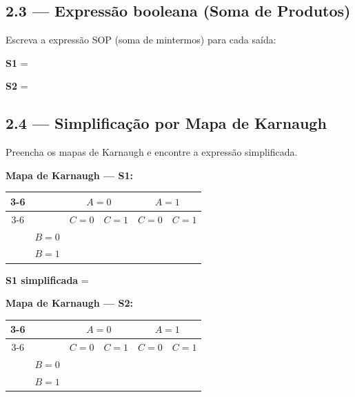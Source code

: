 \documentclass[12pt,a4paper]{article}
\newcommand{\resplinha}[1][4cm]{\underline{\hspace{#1}}}
\newcommand{\celula}{\rule{0pt}{14pt}\hspace{12pt}}
\begin{document}
\subsection{2.3 --- Expressão booleana (Soma de Produtos)}

Escreva a expressão SOP (soma de mintermos) para cada saída:

\noindent \textbf{S1} = \resplinha[10cm]

\vspace{6pt}
\noindent \textbf{S2} = \resplinha[10cm]

\subsection{2.4 --- Simplificação por Mapa de Karnaugh}

Preencha os mapas de Karnaugh e encontre a expressão simplificada.

\vspace{6pt}
\noindent\textbf{Mapa de Karnaugh --- S1:}
\begin{center}
\begin{tabular}{cc|c|c|c|c|}
\cline{3-6}
& & \multicolumn{2}{c|}{$A=0$} & \multicolumn{2}{c|}{$A=1$} \\
\cline{3-6}
& & $C=0$ & $C=1$ & $C=0$ & $C=1$ \\
\hline
\multicolumn{1}{|c}{\multirow{2}{*}{}} & $B=0$ & \celula & \celula & \celula & \celula \\
\cline{2-6}
\multicolumn{1}{|c}{} & $B=1$ & \celula & \celula & \celula & \celula \\
\hline
\end{tabular}
\end{center}

\noindent \textbf{S1 simplificada} = \resplinha[10cm]

\vspace{6pt}
\noindent\textbf{Mapa de Karnaugh --- S2:}
\begin{center}
\begin{tabular}{cc|c|c|c|c|}
\cline{3-6}
& & \multicolumn{2}{c|}{$A=0$} & \multicolumn{2}{c|}{$A=1$} \\
\cline{3-6}
& & $C=0$ & $C=1$ & $C=0$ & $C=1$ \\
\hline
\multicolumn{1}{|c}{\multirow{2}{*}{}} & $B=0$ & \celula & \celula & \celula & \celula \\
\cline{2-6}
\multicolumn{1}{|c}{} & $B=1$ & \celula & \celula & \celula & \celula \\
\hline
\end{tabular}
\end{center}
\end{document}
